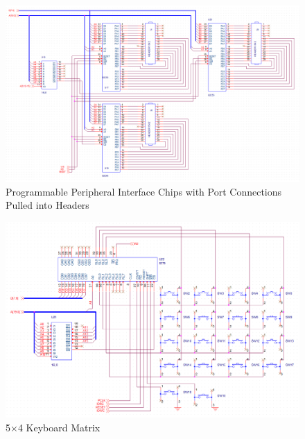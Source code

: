 \begin{appendices}
        \begin{figure}[ht]
            \begin{center}
                \includegraphics[width=1\textwidth]{figures/schematics/ppi.png}
                \caption{Programmable Peripheral Interface Chips with Port Connections Pulled into Headers} \label{fig:page5}
            \end{center}
        \end{figure}

        \begin{figure}[ht]
            \begin{center}
                \includegraphics[width=1\textwidth]{figures/schematics/keyboard.png}
                \caption{5$\times$4 Keyboard Matrix} \label{fig:page6}
            \end{center}
        \end{figure}


\end{appendices}
